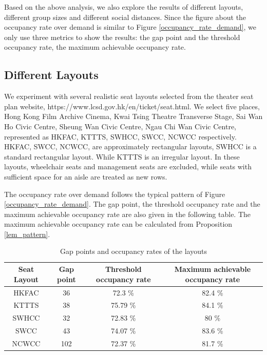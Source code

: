 Based on the above analysis, we also explore the results of different layouts, different group sizes and different social distances. Since the figure about the occupancy rate over demand is similar to Figure \ref{occupancy_rate_demand}, we only use three metrics to show the results: the gap point and the threshold occupancy rate, the maximum achievable occupancy rate.

\subsection*{Different Layouts}
We experiment with several realistic seat layouts selected from the theater seat plan website, https://www.lcsd.gov.hk/en/ticket/seat.html. We select five places, Hong Kong Film Archive Cinema, Kwai Tsing Theatre Transverse Stage, Sai Wan Ho Civic Centre, Sheung Wan Civic Centre, Ngau Chi Wan Civic Centre, represented as HKFAC, KTTTS, SWHCC, SWCC, NCWCC respectively. HKFAC, SWCC, NCWCC, are approximately rectangular layouts, SWHCC is a standard rectangular layout. While KTTTS is an irregular layout. In these layouts, wheelchair seats and management seats are excluded, while seats with sufficient space for an aisle are treated as new rows.

The occupancy rate over demand follows the typical pattern of Figure \ref{occupancy_rate_demand}. The gap point, the threshold occupancy rate and the maximum achievable occupancy rate are also given in the following table. The maximum achievable occupancy rate can be calculated from Proposition \ref{lem_pattern}.

\begin{table}[ht]
  \centering
  \caption{Gap points and occupancy rates of the layouts}
  \begin{tabular}{c|ccc}
  \hline
   Seat Layout & Gap point & Threshold occupancy rate & Maximum achievable occupancy rate \\
  \hline
   HKFAC & 36 & 72.3 \% & 82.4 \% \\
   KTTTS & 38 & 75.79 \% & 84.1 \% \\
   SWHCC & 32 & 72.83 \% & 80 \% \\
   SWCC & 43 & 74.07 \%  & 83.6 \% \\
   NCWCC & 102 & 72.37 \% & 81.7 \% \\
   \hline
  \end{tabular}
\end{table}

